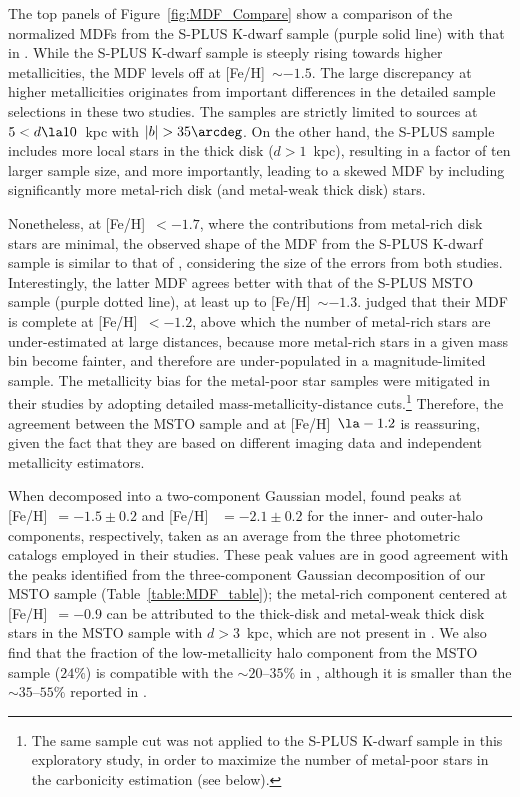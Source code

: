 \documentclass[twocolumn,trackchanges]{aastex63}
\begin{document}
The top panels of Figure~\ref{fig:MDF_Compare} show a comparison of the normalized
MDFs from the S-PLUS K-dwarf sample (purple
solid line) with that in \citet[][red triangles]{An:2015}. While the
S-PLUS K-dwarf sample is steeply rising towards higher metallicities,
the \citet{An:2015} MDF levels off at [Fe/H]~$\sim-1.5$. The large
discrepancy at higher metallicities originates from important
differences in the detailed sample selections in these two studies. The
\citet{An:2013,An:2015} samples are strictly limited to sources at $5 < d
\la10$~kpc with $|b| > 35\arcdeg$. On the other hand, the S-PLUS sample
includes more local stars in the thick disk ($d > 1$~kpc), resulting in
a factor of ten larger sample size, and more importantly, leading to a
skewed MDF by including significantly more metal-rich disk (and
metal-weak thick disk) stars.

Nonetheless, at [Fe/H]~$<-1.7$, where the contributions from metal-rich
disk stars are minimal, the observed shape of the MDF from the S-PLUS
K-dwarf sample is similar to that of \citet{An:2015}, considering the size
of the errors from both studies. Interestingly, the latter MDF agrees better
with that of the S-PLUS MSTO sample (purple dotted line), at least up to
[Fe/H]~$\sim-1.3$. \citet{An:2013,An:2015} judged that their MDF is complete
at [Fe/H]~$<-1.2$, above which the number of metal-rich stars are
under-estimated at large distances, because more metal-rich stars in a
given mass bin become fainter, and therefore are under-populated in a
magnitude-limited sample. The metallicity bias for the metal-poor star
samples were mitigated in their studies by adopting detailed
mass-metallicity-distance cuts.\footnote{The same sample cut was not
applied to the S-PLUS K-dwarf sample in this exploratory study, in order
to maximize the number of metal-poor stars in the carbonicity estimation
(see below).} Therefore, the agreement between the MSTO sample and
\citet{An:2015} at [Fe/H]~$\la-1.2$ is reassuring, given the fact that
they are based on different imaging data and independent metallicity
estimators.

When decomposed into a two-component Gaussian model, \citet{An:2013,
An:2015} found peaks at [Fe/H]~$=-1.5\pm 0.2$ and [Fe/H] ~$=-2.1\pm0.2$ for
the inner- and outer-halo components, respectively, taken as an average
from the three photometric catalogs employed in their studies. These
peak values are in good agreement with the peaks identified from the
three-component Gaussian decomposition of our MSTO sample (Table~\ref{table:MDF_table}); the
metal-rich component centered at [Fe/H]~$= -0.9$ can be attributed to the
thick-disk and metal-weak thick disk stars in the MSTO sample with $d > 3$~kpc, which are not
present in \citet{An:2013,An:2015}. We also find that the fraction of the
low-metallicity halo component from the MSTO sample ($24\%$) is
compatible with the $\sim20$--$35\%$ in \citet{An:2013}, although it is smaller
than the $\sim35$--$55\%$ reported in \citet{An:2015}.
\end{document}
